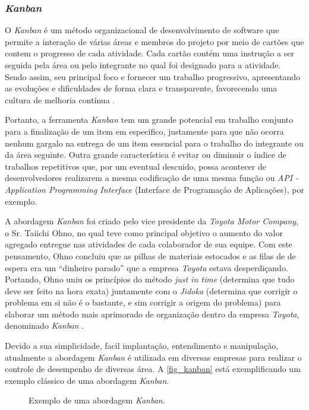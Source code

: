 \subsubsection{\textit{Kanban}}

O \textit{Kanban} é um método organizacional de desenvolvimento de software que permite a interação de várias áreas e membros do projeto por meio de cartões que contem o progresso de cada atividade. Cada cartão contém uma instrução a ser seguida pela área ou pelo integrante no qual foi designado para a atividade. Sendo assim, seu principal foco e fornecer um trabalho progressivo, apresentando as evoluções e dificuldades de forma clara e transparente, favorecendo uma cultura de melhoria contínua \cite{KANBAN2014}.

Portanto, a ferramenta \textit{Kanban} tem um grande potencial em trabalho conjunto para a finalização de um item em especifico, justamente para que não ocorra nenhum gargalo na entrega de um item essencial para o trabalho do integrante ou da área seguinte. Outra grande característica é evitar ou diminuir o índice de trabalhos repetitivos que, por um eventual descuido, possa acontecer de desenvolvedores realizarem a mesma codificação de uma mesma função ou \textit{API - Application Programming Interface} (Interface de Programação de Aplicações), por exemplo.

A abordagem \textit{Kanban} foi criado pelo vice presidente da \textit{Toyota Motor Company}, o Sr. Taiichi Ohno, no qual teve como principal objetivo o aumento do valor agregado entregue nas atividades de cada colaborador de sua equipe. Com este pensamento,  Ohno concluiu que as pilhas de materiais estocados e as filas de de espera era um “dinheiro parado” que a empresa \textit{Toyota} estava desperdiçando. Portando,   Ohno uniu os princípios do método \textit{just in time} (determina que tudo deve ser feito na hora exata)  juntamente com o \textit{Jidoka} (determina que corrigir o problema em si não é o bastante, e sim corrigir a origem do problema) para elaborar um método mais aprimorado de organização dentro da empresa \textit{Toyota}, denominado \textit{Kanban} \cite{TOYOTA1977}.

Devido a sua simplicidade, facil implantação, entendimento e manipulação, atualmente a abordagem \textit{Kanban} é utilizada em diversas empresas para realizar o controle de desempenho de diversas área. A \autoref{fig_kanban} está exemplificando um exemplo clássico de uma abordagem \textit{Kanban}.

\begin{figure}[h]
	\caption{\label{fig_kanban}Exemplo de uma abordagem \textit{Kanban}.}
	\begin{center}
	\end{center}
	\centering {}
\end{figure}